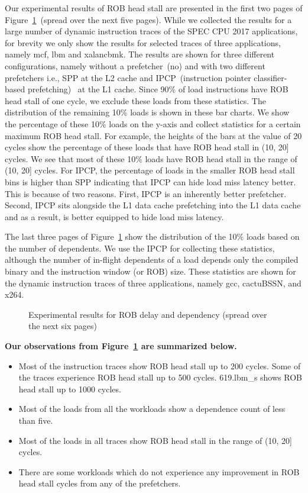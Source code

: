 Our experimental results of ROB head stall are presented in the first two pages of Figure~\ref{fig:robstats}~(spread over the next five pages). While we collected the results for a large number of dynamic instruction traces of the SPEC CPU 2017 applications, for brevity we only show the results for selected traces of three applications, namely mcf, lbm and xalancbmk. The results are shown for three different configurations, namely without a prefetcher~(no) and with two different prefetchers i.e., SPP at the L2 cache and IPCP~(instruction pointer classifier-based prefetching)~\cite{IPCP} at the L1 cache. Since 90\% of load instructions have ROB head stall of one cycle, we exclude these loads from these statistics. The distribution of the remaining 10\% loads is shown in these bar charts. We show the percentage of these 10\% loads on the y-axis and collect statistics for a certain maximum ROB head stall. For example, the heights of the bars at the value of 20 cycles show the percentage of these loads that have ROB head stall in (10, 20] cycles. We see that most of these 10\% loads have ROB head stall in the range of (10, 20] cycles. For IPCP, the percentage of loads in the smaller ROB head stall bins is higher than SPP indicating that IPCP can hide load miss latency better. This is because of two reasons. First, IPCP is an inherently better prefetcher. Second, IPCP sits alongside the L1 data cache prefetching into the L1 data cache and as a result, is better equipped to hide load miss latency.

The last three pages of Figure~\ref{fig:robstats} show the distribution of the 10\% loads based on the number of dependents. We use the IPCP for collecting these statistics, although the number of in-flight dependents of a load depends only the compiled binary and the instruction window (or ROB) size. These statistics are shown for the dynamic instruction traces of three applications, namely gcc, cactuBSSN, and x264.
 \begin{figure}[h!]
 \caption{Experimental results for ROB delay and dependency (spread over the next six pages)}
 \label{fig:robstats}
 \end{figure}


\textbf{Our observations from Figure~\ref{fig:robstats} are summarized below.}
\begin{itemize}
\item Most of the instruction traces show ROB head stall up to  200 cycles. Some of the traces experience ROB head stall up to 500 cycles. 619.lbm\_s shows ROB head stall up to 1000 cycles.
\item Most of the loads from all the workloads show a dependence count of less than five.
\item Most of the loads in all traces show ROB head stall in the range of (10, 20] cycles.
\item There are some workloads which do not experience any improvement in ROB head stall cycles from any of the prefetchers.
\end{itemize}

